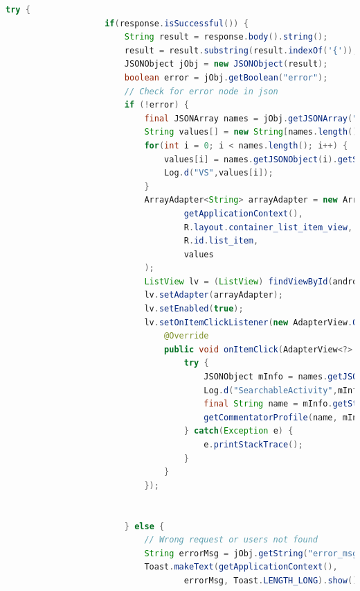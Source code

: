 \documentclass{article}
\begin{document}
\begin{landscape}
\begin{lstlisting}[language=Java, basicstyle=\tiny]
                try {
                    if(response.isSuccessful()) {
                        String result = response.body().string();
                        result = result.substring(result.indexOf('{'));
                        JSONObject jObj = new JSONObject(result);
                        boolean error = jObj.getBoolean("error");
                        // Check for error node in json
                        if (!error) {
                            final JSONArray names = jObj.getJSONArray("users");
                            String values[] = new String[names.length()];
                            for(int i = 0; i < names.length(); i++) {
                                values[i] = names.getJSONObject(i).getString("name");
                                Log.d("VS",values[i]);
                            }
                            ArrayAdapter<String> arrayAdapter = new ArrayAdapter<String>(
                                    getApplicationContext(),
                                    R.layout.container_list_item_view,
                                    R.id.list_item,
                                    values
                            );
                            ListView lv = (ListView) findViewById(android.R.id.list);
                            lv.setAdapter(arrayAdapter);
                            lv.setEnabled(true);
                            lv.setOnItemClickListener(new AdapterView.OnItemClickListener() {
                                @Override
                                public void onItemClick(AdapterView<?> parent, View view, int position, long id) {
                                    try {
                                        JSONObject mInfo = names.getJSONObject(position);
                                        Log.d("SearchableActivity",mInfo.toString());
                                        final String name = mInfo.getString("name");
                                        getCommentatorProfile(name, mInfo.getString("user_id"),databaseService);
                                    } catch(Exception e) {
                                        e.printStackTrace();
                                    }
                                }
                            });


                        } else {
                            // Wrong request or users not found
                            String errorMsg = jObj.getString("error_msg");
                            Toast.makeText(getApplicationContext(),
                                    errorMsg, Toast.LENGTH_LONG).show();


\end{lstlisting}
\end{landscape}
\end{document}
